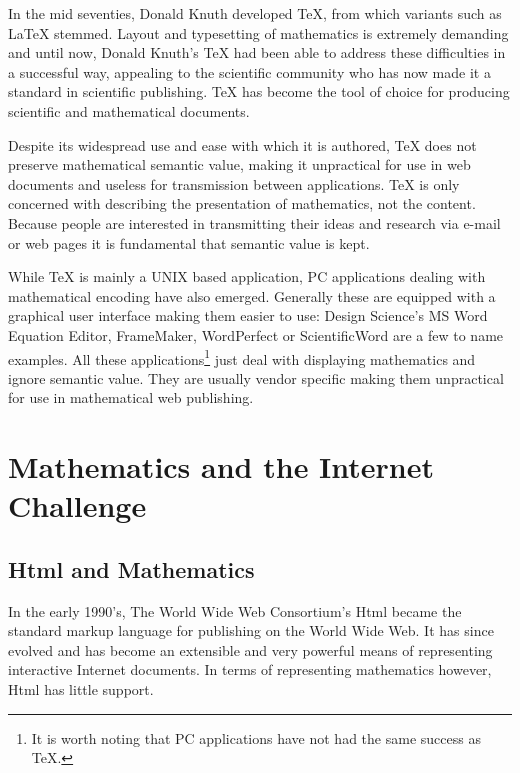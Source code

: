 In the mid seventies, Donald Knuth developed \TeX\index{\TeX}, from which variants such as \LaTeX\index{\LaTeX} stemmed. Layout and
typesetting of mathematics is extremely demanding and until now, Donald Knuth's \TeX\index{\TeX} had been able to address
these difficulties in a successful way, appealing to the scientific community who has now made it a standard in scientific
publishing. \TeX\index{\TeX} has become the tool of choice for producing scientific and mathematical documents.

Despite its widespread use and ease with which it is authored, \TeX\index{\TeX} does not preserve mathematical semantic
value, making it unpractical for use in web documents and useless for transmission between applications. \TeX\index{\TeX}
is only concerned with describing the presentation of mathematics, not the content. Because people are interested in
transmitting their ideas and research via e-mail or web pages it is fundamental that semantic value is kept.

While \TeX\index{\TeX} is mainly a UNIX based application, PC applications dealing with mathematical encoding have also emerged. Generally these
are equipped with a graphical user interface making them easier to use: Design Science's MS Word Equation Editor,
FrameMaker, WordPerfect or ScientificWord are a few to name examples. All these
applications\footnote{It is worth noting that PC applications have not had the same success as \TeX\index{\TeX}.} just deal with displaying
mathematics and ignore semantic value. They are usually vendor specific making them unpractical for use in mathematical web publishing.

\section{Mathematics and the Internet Challenge}

\subsection{Html and Mathematics}

In the early 1990's, The World Wide Web Consortium's Html  became the
standard markup language for publishing on the World Wide Web. It has since evolved and has become an extensible and very
powerful means of representing interactive Internet documents. In terms of representing mathematics however, Html has
little support.

